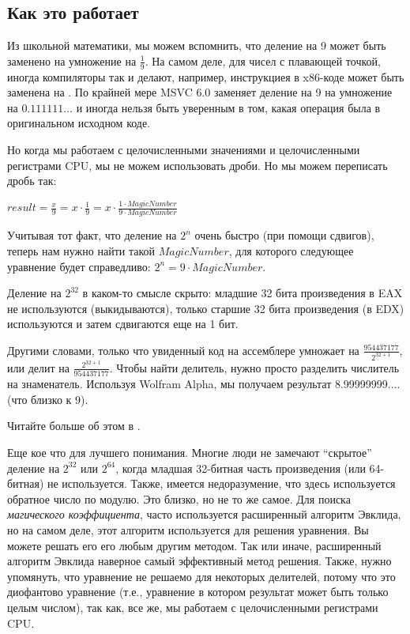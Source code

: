 ﻿\subsection{Как это работает}

Из школьной математики, мы можем вспомнить, что деление на 9 может быть заменено на умножение на $\frac{1}{9}$.
На самом деле, для чисел с плавающей точкой, иногда компиляторы так и делают,
например, инструкциея  в x86-коде может быть заменена на .
По крайней мере MSVC 6.0 заменяет деление на 9 на умножение на $0.111111...$ и иногда нельзя быть уверенным в том,
какая операция была в оригинальном исходном коде.

Но когда мы работаем с целочисленными значениями и целочисленными регистрами CPU, мы не можем использовать дроби.
Но мы можем переписать дробь так:

\begin{center}
$result = \frac{x}{9} = x \cdot \frac{1}{9} = x \cdot \frac{1 \cdot MagicNumber}{9 \cdot MagicNumber}$
\end{center}

Учитывая тот факт, что деление на $2^n$ очень быстро (при помощи сдвигов), теперь нам нужно найти такой $MagicNumber$,
для которого следующее уравнение будет справедливо: $2^n = 9 \cdot MagicNumber$.

Деление на $2^{32}$ в каком-то смысле скрыто: младшие 32 бита произведения в EAX не используются (выкидываются),
только старшие 32 бита произведения (в EDX) используются и затем сдвигаются еще на 1 бит.

Другими словами, только что увиденный код на ассемблере умножает на {\Large $\frac{954437177}{2^{32+1}}$},
или делит на {\Large $\frac{2^{32+1}}{954437177}$}.
Чтобы найти делитель, нужно просто разделить числитель на знаменатель.
Используя Wolfram Alpha, мы получаем результат 8.99999999.... (что близко к 9).


Читайте больше об этом в .

Еще кое что для лучшего понимания.
Многие люди не замечают ``скрытое'' деление на $2^{32}$ или $2^{64}$,
когда младшая 32-битная часть произведения (или 64-битная) не используется.
Также, имеется недоразумение, что здесь используется обратное число по модулю.
Это близко, но не то же самое.
Для поиска \textit{магического коэффициента}, часто используется расширенный алгоритм Эвклида, но на самом деле,
этот алгоритм используется для решения уравнения.
Вы можете решать его его любым другим методом.
Так или иначе, расширенный алгоритм Эвклида наверное самый эффективный метод решения.
Также, нужно упомянуть, что уравнение не решаемо для некоторых делителей, потому что это диофантово уравнение
(т.е., уравнение в котором результат может быть только целым числом), так как, все же, мы работаем с целочисленными
регистрами CPU.

